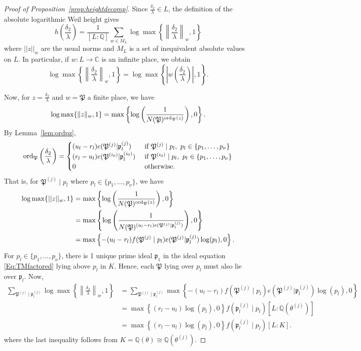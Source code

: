 \begin{proof}[Proof of Proposition~\ref{prop:heightdecomp}]Since $\frac{\delta_2}{\lambda} \in L$, the definition of the absolute logarithmic Weil height gives
\[h\left(\frac{\delta_2}{\lambda}\right)=\frac{1}{[L:\mathbb{Q}]}\sum_{w \in M_L} \log \max \left\{ \left\|\frac{\delta_2}{\lambda}\right\|_{w}, 1\right\}\]
where $||z||_w$ are the usual norms and $M_L$ is a set of inequivalent absolute values on $L$. In particular, if $w: L \to \mathbb{C}$ is an infinite place, we obtain
\[ \log \max \left\{ \left\|\frac{\delta_2}{\lambda}\right\|_{w}, 1\right\} = \log \max \left\{ \left|w\left(\frac{\delta_2}{\lambda}\right)\right|, 1\right\}.\]

Now, for $z = \frac{\delta_2}{\lambda}$ and $w = \mathfrak{P}$ a finite place, we have
\[ \log \max \{ \|z\|_{w}, 1\} = \max \left\{ \log\left(\frac{1}{N(\mathfrak{P})^{\operatorname{ord}_{\mathfrak{P}}(z)}} \right), 0\right\}. \]
By Lemma~\ref{lem:ordpz}, 
\[\operatorname{ord}_{\mathfrak{P}}\left( \frac{\delta_2}{\lambda}\right)=
\begin{cases}
(u_l - r_l)e(\mathfrak{P}^{(j)}|\mathfrak{p}_l^{(j)})	
	& \textnormal{ if } \mathfrak{P}^{(j)} \mid p_l , \ p_l \in \{p_1,\dots, p_{\nu}\}\\
(r_l - u_l)e(\mathfrak{P}^{(i_0)}|\mathfrak{p}_l^{(i_0)})
	& \textnormal{ if } \mathfrak{P}^{(i_0)}\mid p_l, \ p_l \in \{p_1,\dots, p_{\nu}\}\\
0 	& \textnormal{ otherwise}.
\end{cases}\]
That is, for $\mathfrak{P}^{(j)}\mid p_l$ where $p_l \in \{p_1, \dots, p_{\nu}\}$, we have
\begin{align*}
 \log \max \{ ||z||_{w}, 1\}	
 	& = \max \left\{ \log\left(\frac{1}{N(\mathfrak{P})^{\operatorname{ord}_{\mathfrak{P}}(z)}} \right), 0\right\}\\
	& = \max \left\{ \log\left(\frac{1}{N(\mathfrak{P})^{(u_l - r_l)e(\mathfrak{P}^{(j)}|\mathfrak{p}_l^{(j)})}} \right), 0\right\}\\
	& = \max \left\{ -(u_l - r_l)f(\mathfrak{P}^{(j)}\mid p_l)e(\mathfrak{P}^{(j)}|\mathfrak{p}_l^{(j)})\log(p_l), 0\right\}.
\end{align*}
For $p_l \in \{p_1, \dots, p_{\nu}\}$, there is 1 unique prime ideal $\mathfrak{p}_1$ in the ideal equation \eqref{Eq:TMfactored} lying above $p_l$ in $K$. Hence, each $\mathfrak{P}$ lying over $p_l$ must also lie over $\mathfrak{p}_l$. Now, 
\begin{align*}
\sum_{\mathfrak{P}^{(j)} \mid \mathfrak{p}_l^{(j)}} \log \max \left\{ \left\|\frac{\delta_2}{\lambda}\right\|_{w}, 1\right\}
	& = \sum_{\mathfrak{P}^{(j)} \mid \mathfrak{p}_l^{(j)}} \max \left\{ -(u_l - r_l)f(\mathfrak{P}^{(j)}\mid p_l)e(\mathfrak{P}^{(j)}|\mathfrak{p}_l^{(j)})\log(p_l), 0\right\}\\
	& = \max \left\{ (r_l - u_l)\log(p_l), 0\right\}f(\mathfrak{p}_l^{(j)}\mid p_l)[L:\mathbb{Q}(\theta^{(j)})]\\
	& = \max \left\{ (r_l - u_l)\log(p_l), 0\right\}f(\mathfrak{p}_l^{(j)}\mid p_l)[L:K].
\end{align*}
where the last inequality follows from $K = \mathbb{Q}(\theta) \cong \mathbb{Q}(\theta^{(j)})$.


\end{proof}
